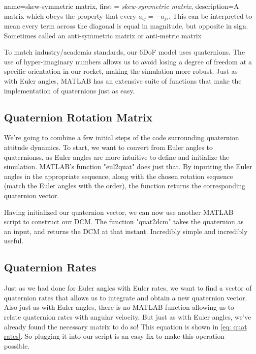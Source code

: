 \documentclass[12pt]{report}
\begin{document}
{
    name=skew-symmetric matrix,
    first = {\textit{skew-symmetric matrix}},
    description={A matrix which obeys the property that every $a_{ij}=-a_{ji}$. This can be interpreted to mean every term across the diagonal is equal in magnitude, but opposite in sign. Sometimes called an anti-symmetric matrix or anti-metric matrix}
}

To match industry/academia standards, our 6DoF model uses \glspl{quaternion}. The use of hyper-imaginary numbers allows us to avoid losing a degree of freedom at a specific orientation in our rocket, making the simulation more robust. Just as with Euler angles, MATLAB has an extensive suite of functions that make the implementation of \glspl{quaternion} just as easy. 

\subsection{Quaternion Rotation Matrix}

We're going to combine a few initial steps of the code surrounding \gls{quaternion} attitude dynamics. To start, we want to convert from Euler angles to \glspl{quaternion}s, as Euler angles are more intuitive to define and initialize the simulation. MATLAB's function "eul2quat" does just that. By inputting the Euler angles in the appropriate sequence, along with the chosen rotation sequence (match the Euler angles with the order), the function returns the corresponding quaternion vector. 

Having initialized our quaternion vector, we can now use another MATLAB script to construct our DCM. The function "quat2dcm" takes the quaternion as an input, and returns the DCM at that instant. Incredibly simple and incredibly useful. 


\subsection{Quaternion Rates}\label{sec: quaternion rates}

Just as we had done for Euler angles with Euler rates, we want to find a vector of quaternion rates that allows us to integrate and obtain a new quaternion vector. Also just as with Euler angles, there is no MATLAB function allowing us to relate quaternion rates with angular velocity. But just as with Euler angles, we've already found the necessary matrix to do so! This equation is shown in \eqref{eq: quat rates}. So plugging it into our script is an easy fix to make this operation possible.
\end{document}
